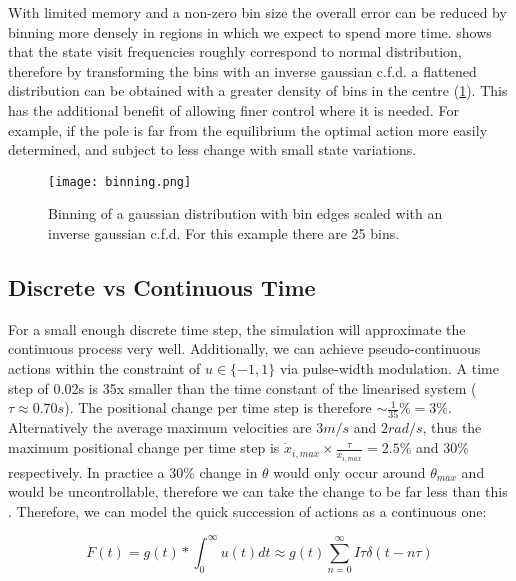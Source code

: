 \documentclass[../main.tex]{subfiles}
\begin{document}
With limited memory and a non-zero bin size the overall error can be reduced by binning more densely in regions in which we expect to spend more time.  shows that the state visit frequencies roughly correspond to normal distribution, therefore by transforming the bins with an inverse gaussian c.f.d. a flattened distribution can be obtained with a greater density of bins in the centre (\cref{fig:binning}). This has the additional benefit of allowing finer control where it is needed. For example, if the pole is far from the equilibrium the optimal action more easily determined, and subject to less change with small state variations.

\begin{figure}[h]
   \centering
   \texttt{[image: binning.png]}
   \caption{Binning of a gaussian distribution with bin edges scaled with an inverse gaussian c.f.d. For this example there are 25 bins.}
   \label{fig:binning}
\end{figure}

\subsection{Discrete vs Continuous Time}

For a small enough discrete time step, the simulation will approximate the continuous process very well. Additionally, we can achieve pseudo-continuous actions within the constraint of $u \in \{-1, 1\}$ via pulse-width modulation. A time step of 0.02s is 35x smaller than the time constant of the linearised system ($\tau \approx 0.70s$). The positional change per time step is therefore $\sim \frac{1}{35}\% = 3\%$. Alternatively the average maximum velocities are $3m/s$ and $2rad/s$, thus the maximum positional change per time step is $\dot{x}_{i, max} \times \frac{\tau}{x_{i, max}} = 2.5\%$ and $30\%$ respectively. In practice a $30\%$ change in $\theta$ would only occur around $\theta_{max}$ and would be uncontrollable, therefore we can take the change to be far less than this . Therefore, we can model the quick succession of actions as a continuous one:

\begin{equation}
   F(t) = g(t) * \int^\infty_0 u(t) dt \approx g(t) \sum^\infty_{n=0} I\tau \delta(t-n\tau)
\end{equation} 
\end{document}
